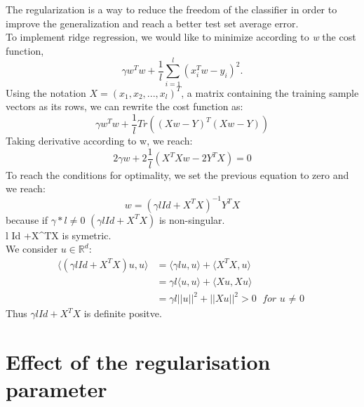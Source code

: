 \documentclass{article} %
\begin{document}
The regularization is a way to reduce the freedom of the classifier in order to improve the generalization and reach a better test set average error. 
\\ To implement ridge regression, we would like to minimize according to \textit{w} the cost function, 
\begin{equation}
\gamma w^{T}w + \frac{1}{l} \sum_{i=1}^{l}(x_{i}^{T}w - y_{i})^{2}.
\end{equation}
Using the notation $X=(x_{1}, x_{2},...,x_{l})^{T}$, a matrix containing the training sample vectors as its rows, we can rewrite the cost function as: 
\begin{equation}
\gamma w^{T} w + \frac{1}{l} Tr((Xw - Y)^{T}(Xw - Y))
\end{equation}
Taking derivative according to w, we reach: 
\begin{equation}
2\gamma w + 2 \frac{1}{l} (X^{T}Xw - 2Y^{T}X)=0
\end{equation}
To reach the conditions for optimality, we set the previous equation to zero and we reach: 
\begin{equation}
w=(\gamma l Id +X^{T}X)^{-1}Y^{T}X
\end{equation}
because if $\gamma*l \ne 0$ $(\gamma l Id +X^{T}X)$ is non-singular.
\\\gamma l Id +X^{T}X is symetric.
\\ We consider $u \in \mathbb{R}^{d}$:
\begin{align*}
\langle (\gamma l Id +X^{T}X)u,u \rangle &= \langle \gamma l u,u \rangle + \langle X^{T}X,u \rangle
\\  &= \gamma l \langle  u,u \rangle + \langle X u, X u \rangle
\\ &= \gamma l ||u||^{2} + ||Xu||^{2} > 0 \textit{ for u $\ne$ 0}
\end{align*}
Thus $\gamma l Id +X^{T}X$ is definite positve. 

\section{Effect of the regularisation parameter}
\end{document}
